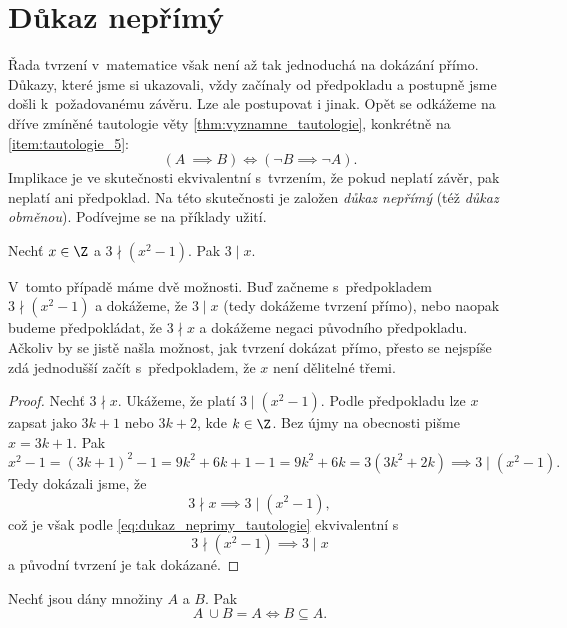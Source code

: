 \section{Důkaz nepřímý}\label{sec:dukaz_neprimy}
Řada tvrzení v~matematice však není až tak jednoduchá na dokázání přímo. Důkazy, které jsme si ukazovali, vždy začínaly od předpokladu a postupně jsme došli k~požadovanému závěru. Lze ale postupovat i jinak. Opět se odkážeme na dříve zmíněné tautologie věty \ref{thm:vyznamne_tautologie}, konkrétně na \ref{item:tautologie_5}:
\begin{equation}\label{eq:dukaz_neprimy_tautologie}
    (A~\implies B) \iff (\neg B \implies \neg A).
\end{equation}
Implikace je ve skutečnosti ekvivalentní s~tvrzením, že pokud neplatí závěr, pak neplatí ani předpoklad. Na této skutečnosti je založen \emph{důkaz nepřímý} (též \emph{důkaz obměnou}). Podívejme se na příklady užití.
\begin{proposition}
    Nechť $x\in\Z$ a $3 \nmid (x^2-1)$. Pak $3 \mid x$.
\end{proposition}
V~tomto případě máme dvě možnosti. Buď začneme s~předpokladem $3 \nmid (x^2-1)$ a dokážeme, že $3 \mid x$ (tedy dokážeme tvrzení přímo), nebo naopak budeme předpokládat, že $3 \nmid x$ a dokážeme negaci původního předpokladu. Ačkoliv by se jistě našla možnost, jak tvrzení dokázat přímo, přesto se nejspíše zdá jednodušší začít s~předpokladem, že $x$ není dělitelné třemi.
\begin{proof}
    Nechť $3 \nmid x$. Ukážeme, že platí $3 \mid (x^2-1)$. Podle předpokladu lze $x$ zapsat jako $3k+1$ nebo $3k+2$, kde $k\in\Z$. Bez újmy na obecnosti pišme $x=3k+1$. Pak
    \begin{equation*}
        x^2-1=(3k+1)^2-1=9k^2+6k+1-1=9k^2+6k=3(3k^2+2k)\implies 3 \mid (x^2-1).
    \end{equation*}
    Tedy dokázali jsme, že
    \begin{equation*}
        3 \nmid x \implies 3 \mid (x^2-1),
    \end{equation*}
    což je však podle \ref{eq:dukaz_neprimy_tautologie} ekvivalentní
s~\begin{equation*}
        3 \nmid (x^2-1) \implies 3 \mid x
    \end{equation*}
    a původní tvrzení je tak dokázané.
\end{proof}
\begin{proposition}
    Nechť jsou dány množiny $A$ a $B$. Pak
    \begin{equation*}
        A~\cup B=A \iff B \subseteq A.
    \end{equation*}
\end{proposition}
